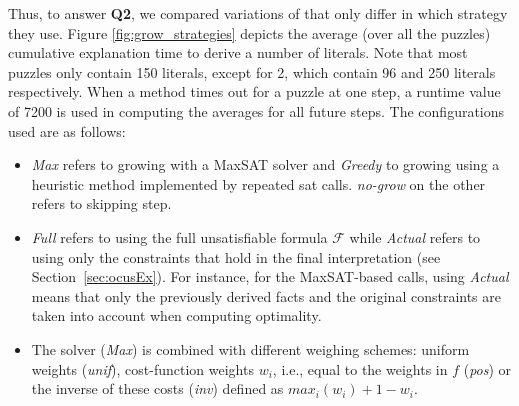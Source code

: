 Thus, to answer \textbf{Q2}, we compared variations of  \comus that only differ in which \grow strategy they use. 
Figure \ref{fig:grow_strategies} depicts the average (over all the puzzles) cumulative explanation time to derive a number of literals. Note that most puzzles only contain 150 literals, except for 2, which contain 96 and 250 literals respectively. When a method times out for a puzzle at one step, a runtime value of 7200 is used in computing the averages for all future steps.
The configurations used are as follows:
\begin{itemize}
\item \emph{Max} refers to growing with a MaxSAT solver and \emph{Greedy} to growing using a heuristic method implemented by repeated sat calls. 
\emph{no-grow} on the other refers to skipping \grow step.
\item  \emph{Full} refers to using the full unsatisfiable formula $\mathcal{F}$  while \emph{Actual} refers to using only the constraints that hold in the final interpretation (see Section~\ref{sec:ocusEx}). For instance, for the MaxSAT-based calls, using \emph{Actual} means that only the previously derived facts and the original constraints are taken into account when computing optimality. 
\item The \maxsat solver (\emph{Max}) is combined with different weighing schemes: uniform weights (\emph{unif}), cost-function weights $w_i$, i.e., equal to the weights in $f$ (\emph{pos}) or the inverse of these costs (\emph{inv}) defined as $max_i(w_i) + 1 - w_i$.%
\end{itemize}


